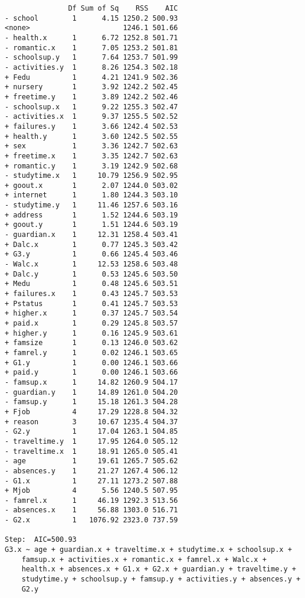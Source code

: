 \documentclass[11pt]{article}
\begin{document}
\begin{enumerate}
\begin{verbatim}
               Df Sum of Sq    RSS    AIC
- school        1      4.15 1250.2 500.93
<none>                      1246.1 501.66
- health.x      1      6.72 1252.8 501.71
- romantic.x    1      7.05 1253.2 501.81
- schoolsup.y   1      7.64 1253.7 501.99
- activities.y  1      8.26 1254.3 502.18
+ Fedu          1      4.21 1241.9 502.36
+ nursery       1      3.92 1242.2 502.45
+ freetime.y    1      3.89 1242.2 502.46
- schoolsup.x   1      9.22 1255.3 502.47
- activities.x  1      9.37 1255.5 502.52
+ failures.y    1      3.66 1242.4 502.53
+ health.y      1      3.60 1242.5 502.55
+ sex           1      3.36 1242.7 502.63
+ freetime.x    1      3.35 1242.7 502.63
+ romantic.y    1      3.19 1242.9 502.68
- studytime.x   1     10.79 1256.9 502.95
+ goout.x       1      2.07 1244.0 503.02
+ internet      1      1.80 1244.3 503.10
- studytime.y   1     11.46 1257.6 503.16
+ address       1      1.52 1244.6 503.19
+ goout.y       1      1.51 1244.6 503.19
- guardian.x    1     12.31 1258.4 503.41
+ Dalc.x        1      0.77 1245.3 503.42
+ G3.y          1      0.66 1245.4 503.46
- Walc.x        1     12.53 1258.6 503.48
+ Dalc.y        1      0.53 1245.6 503.50
+ Medu          1      0.48 1245.6 503.51
+ failures.x    1      0.43 1245.7 503.53
+ Pstatus       1      0.41 1245.7 503.53
+ higher.x      1      0.37 1245.7 503.54
+ paid.x        1      0.29 1245.8 503.57
+ higher.y      1      0.16 1245.9 503.61
+ famsize       1      0.13 1246.0 503.62
+ famrel.y      1      0.02 1246.1 503.65
+ G1.y          1      0.00 1246.1 503.66
+ paid.y        1      0.00 1246.1 503.66
- famsup.x      1     14.82 1260.9 504.17
- guardian.y    1     14.89 1261.0 504.20
- famsup.y      1     15.18 1261.3 504.28
+ Fjob          4     17.29 1228.8 504.32
+ reason        3     10.67 1235.4 504.37
- G2.y          1     17.04 1263.1 504.85
- traveltime.y  1     17.95 1264.0 505.12
- traveltime.x  1     18.91 1265.0 505.41
- age           1     19.61 1265.7 505.62
- absences.y    1     21.27 1267.4 506.12
- G1.x          1     27.11 1273.2 507.88
+ Mjob          4      5.56 1240.5 507.95
- famrel.x      1     46.19 1292.3 513.56
- absences.x    1     56.88 1303.0 516.71
- G2.x          1   1076.92 2323.0 737.59

Step:  AIC=500.93
G3.x ~ age + guardian.x + traveltime.x + studytime.x + schoolsup.x + 
    famsup.x + activities.x + romantic.x + famrel.x + Walc.x + 
    health.x + absences.x + G1.x + G2.x + guardian.y + traveltime.y + 
    studytime.y + schoolsup.y + famsup.y + activities.y + absences.y + 
    G2.y


\end{verbatim}
\end{enumerate}
\end{document}
